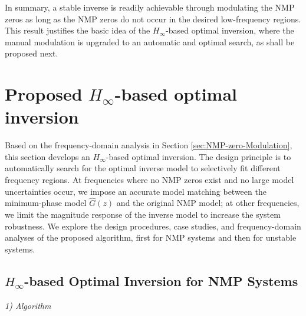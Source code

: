 \documentclass [11pt, proquest] {uwthesis}[2020/02/24]
\begin{document}
In summary, a stable inverse is readily achievable through modulating
the NMP zeros as long as the NMP zeros do not occur in the desired
low-frequency regions. This result justifies the basic idea of the
$H_{\infty}$-based optimal inversion, where the manual modulation
is upgraded to an automatic and optimal search, as shall be proposed
next.

\section{\label{sec:-based-Optimal-Design}Proposed $H_{\infty}$-based optimal
inversion}

Based on the frequency-domain analysis in Section \ref{sec:NMP-zero-Modulation},
this section develops an $H_{\infty}$-based optimal inversion. The
design principle is to automatically search for the optimal inverse
model to selectively fit different frequency regions. At frequencies
where no NMP zeros exist and no large model uncertainties occur, we
impose an accurate model matching between the minimum-phase model
$\hat{G}(z)$ and the original NMP model; at other frequencies,
we limit the magnitude response of the inverse model to increase the
system robustness. We explore the design procedures, case studies,
and frequency-domain analyses of the proposed algorithm, first for
NMP systems and then for unstable systems. 

\subsection{\label{subsec:-based-optimal-inversion}$H_{\infty}$-based Optimal
Inversion for NMP Systems}

\noindent \emph{1) Algorithm}
\end{document}
